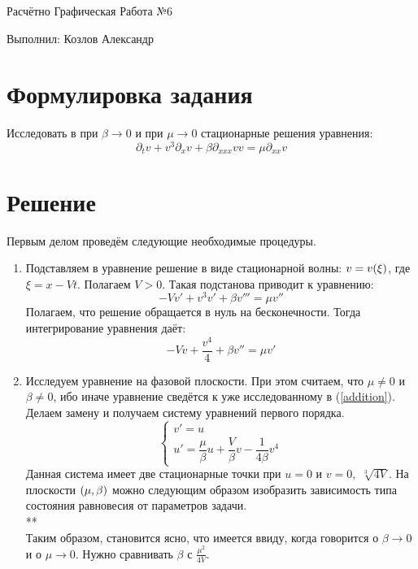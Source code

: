 \documentclass[titlepage]{article}
\begin{document}
\begin{flushright}
    Расчётно Графическая Работа №6
    
    Выполнил: Козлов Александр
\end{flushright}

\section{Формулировка задания}

Исследовать в при $\beta \longrightarrow 0$ и при $\mu \longrightarrow 0$ стационарные решения уравнения:
\begin{equation}
    \partial_t v + v^3 \partial_x v + \beta \partial_{xxx} v v = \mu \partial_{xx} v
\end{equation}
\section{Решение}
Первым делом проведём следующие необходимые процедуры.
\begin{enumerate}
 \item Подставляем в уравнение решение в виде стационарной волны: $v = v\qty(\xi)$, где $\xi = x - Vt$. Полагаем $V > 0$. Такая  подстанова приводит к уравнению:
 \begin{equation}
  -Vv' + v^3v' + \beta v''' = \mu v''
 \end{equation}
Полагаем, что решение обращается в нуль на бесконечности. Тогда интегрирование уравнения даёт:
\begin{equation}
  -Vv + \dfrac{v^4}{4} + \beta v'' = \mu v'
\end{equation}
\item \label{bla} Исследуем уравнение на фазовой плоскости. При этом считаем, что $\mu \not = 0$ и $\beta \not = 0$, ибо иначе уравнение сведётся к уже исследованному в (\ref{addition}). Делаем замену и получаем систему уравнений первого порядка.
$$
\begin{cases}
    v'= u \\
    u'= \dfrac{\mu}{\beta}u + \dfrac{V}{\beta}v - \dfrac1{4\beta} v^4
\end{cases}
$$
Данная система имеет две стационарные точки при $u = 0$ и $v = 0,$ $\sqrt[3]{4V}$. На плоскости $\qty(\mu,\beta)$ можно следующим образом изобразить зависимость типа состояния равновесия от параметров задачи.\\
{\LARGE ***}\\
Таким образом, становится ясно, что имеется ввиду, когда говорится о $\beta \longrightarrow 0$ и о $\mu \longrightarrow 0$. Нужно сравнивать $\beta$ с $\frac{\mu^2}{4V}$.
\end{enumerate}
\end{document}
